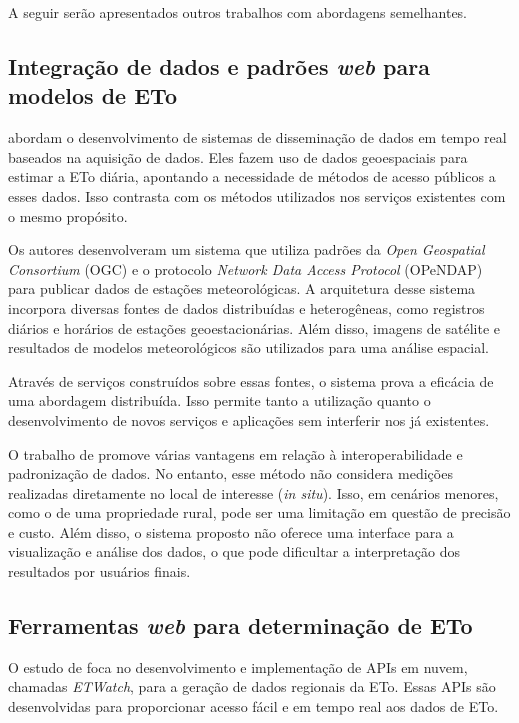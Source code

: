 A seguir serão apresentados outros trabalhos com abordagens semelhantes.

\subsection{Integração de dados e padrões \textit{web} para modelos de ETo}

\textcite{Jianting_webeva2009} abordam o desenvolvimento de sistemas de disseminação de dados em tempo real baseados na aquisição de dados. Eles fazem uso de dados geoespaciais para estimar a ETo diária, apontando a necessidade de métodos de acesso públicos a esses dados. Isso contrasta com os métodos utilizados nos serviços existentes com o mesmo propósito.

Os autores desenvolveram um sistema que utiliza padrões da \textit{Open Geospatial Consortium} (OGC) e o protocolo \textit{Network Data Access Protocol} (OPeNDAP) para publicar dados de estações meteorológicas. A arquitetura desse sistema incorpora diversas fontes de dados distribuídas e heterogêneas, como registros diários e horários de estações geoestacionárias. Além disso, imagens de satélite e resultados de modelos meteorológicos são utilizados para uma análise espacial. 

Através de serviços construídos sobre essas fontes, o sistema prova a eficácia de uma abordagem distribuída. Isso permite tanto a utilização quanto o desenvolvimento de novos serviços e aplicações sem interferir nos já existentes.

O trabalho de \textcite{Jianting_webeva2009} promove várias vantagens em relação à interoperabilidade e padronização de dados. No entanto, esse método não considera medições realizadas diretamente no local de interesse (\textit{in situ}). Isso, em cenários menores, como o de uma propriedade rural, pode ser uma limitação em questão de precisão e custo. Além disso, o sistema proposto não oferece uma interface para a visualização e análise dos dados, o que pode dificultar a interpretação dos resultados por usuários finais.

\subsection{Ferramentas \textit{web} para determinação de ETo}

O estudo de \textcite{Fangming_webeva2021} foca no desenvolvimento e implementação de APIs em nuvem, chamadas \textit{ETWatch}, para a geração de dados regionais da ETo. Essas APIs são desenvolvidas para proporcionar acesso fácil e em tempo real aos dados de ETo.

